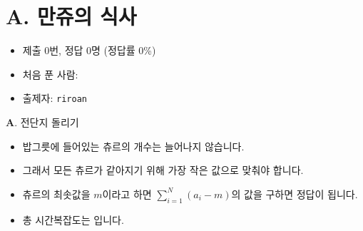 \section{A. 만쥬의 식사}

\begin{frame} %
    \begin{itemize}
        \item 제출 0번, 정답 0명 (정답률 0\%)
        \item 처음 푼 사람: \textbf{} 
        \item 출제자: \texttt{riroan}
    \end{itemize}
\end{frame}

\begin{frame}{\textbf{A}. 전단지 돌리기}
    \begin{itemize}
        \item 밥그릇에 들어있는 츄르의 개수는 늘어나지 않습니다.
        \item 그래서 모든 츄르가 같아지기 위해 가장 작은 값으로 맞춰야 합니다.
        \item 츄르의 최솟값을 $m$이라고 하면 $\sum_{i=1}^N (a_i - m)$의 값을 구하면 정답이 됩니다.
		\item 총 시간복잡도는 입니다.
    \end{itemize}
\end{frame}